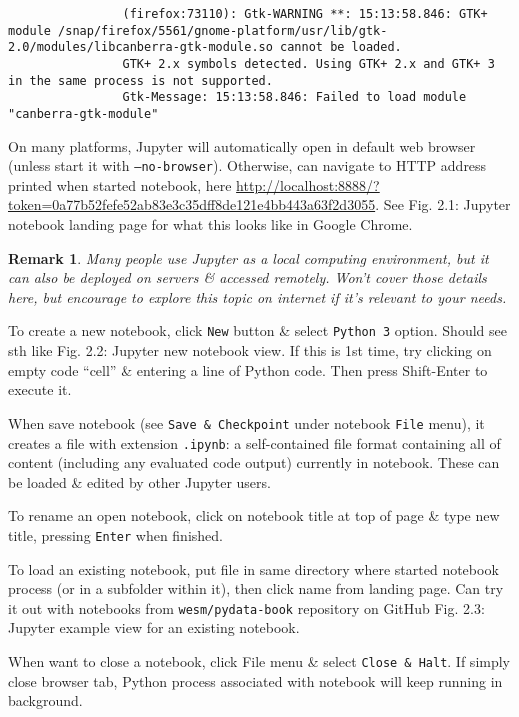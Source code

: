 \documentclass{article}
\newtheorem{remark}{Remark}
\begin{document}
\begin{itemize}
\begin{itemize}
\begin{itemize}
\begin{verbatim}
				(firefox:73110): Gtk-WARNING **: 15:13:58.846: GTK+ module /snap/firefox/5561/gnome-platform/usr/lib/gtk-2.0/modules/libcanberra-gtk-module.so cannot be loaded.
				GTK+ 2.x symbols detected. Using GTK+ 2.x and GTK+ 3 in the same process is not supported.
				Gtk-Message: 15:13:58.846: Failed to load module "canberra-gtk-module"
			\end{verbatim}
			On many platforms, Jupyter will automatically open in default web browser (unless start it with {\tt--no-browser}). Otherwise, can navigate to HTTP address printed when started notebook, here \url{http://localhost:8888/?token=0a77b52fefe52ab83e3c35dff8de121e4bb443a63f2d3055}. See {\sf Fig. 2.1: Jupyter notebook landing page} for what this looks like in Google Chrome.				
			\begin{remark}
				Many people use Jupyter as a local computing environment, but it can also be deployed on servers \& accessed remotely. Won't cover those details here, but encourage to explore this topic on internet if it's relevant to your needs.
			\end{remark}
			To create a new notebook, click {\tt New} button \& select {\tt Python 3} option. Should see sth like {\sf Fig. 2.2: Jupyter new notebook view}. If this is 1st time, try clicking on empty code ``cell'' \& entering a line of Python code. Then press Shift-Enter to execute it.
			
			When save notebook (see {\tt Save \& Checkpoint} under notebook {\tt File} menu), it creates a file with extension {\tt.ipynb}: a self-contained file format containing all of content (including any evaluated code output) currently in notebook. These can be loaded \& edited by other Jupyter users.
			
			To rename an open notebook, click on notebook title at top of page \& type new title, pressing {\tt Enter} when finished.
			
			To load an existing notebook, put file in same directory where started notebook process (or in a subfolder within it), then click name from landing page. Can try it out with notebooks from {\tt wesm/pydata-book} repository on GitHub {\sf Fig. 2.3: Jupyter example view for an existing notebook}.
			
			When want to close a notebook, click File menu \& select {\tt Close \& Halt}. If simply close browser tab, Python process associated with notebook will keep running in background.
			

\end{itemize}
\end{itemize}
\end{itemize}
\end{document}
